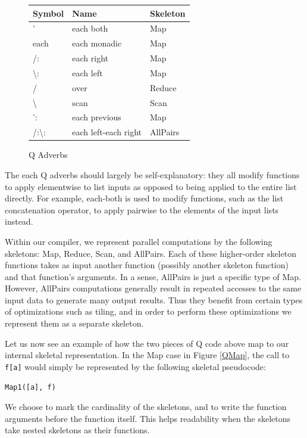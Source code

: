 \documentclass[preprint]{sigplanconf}
\begin{document}
\begin{figure}
\centering
\begin{tabular}{|l|l|l|}
\hline Symbol & Name & Skeleton\\
\hline ' & each both & Map \\
\hline each & each monadic & Map \\
\hline /: & each right & Map \\
\hline \textbackslash: & each left & Map\\
\hline / & over & Reduce \\
\hline \textbackslash & scan & Scan \\
\hline ': & each previous & Map \\
\hline /:\textbackslash: & each left-each right & AllPairs \\
\hline
\end{tabular}
\caption{Q Adverbs}
\label{QAdverbs}
\end{figure}

The each Q adverbs should largely be self-explanatory: they all modify functions to apply elementwise to list inputs as opposed to being applied to the entire list directly.  For example, each-both is used to modify functions, such as the list concatenation operator, to apply pairwise to the elements of the input lists instead.

Within our compiler, we represent parallel computations by the following skeletons: Map, Reduce, Scan, and AllPairs.  Each of these higher-order skeleton functions takes as input another function (possibly another skeleton function) and that function's arguments.  In a sense, AllPairs is just a specific type of Map.  However, AllPairs computations generally result in repeated accesses to the same input data to generate many output results.  Thus they benefit from certain types of optimizations such as tiling, and in order to perform these optimizations we represent them as a separate skeleton.

Let us now see an example of how the two pieces of Q code above map to our internal skeletal representation.  In the Map case in Figure \ref{QMap}, the call to \texttt{f[a]} would simply be represented by the following skeletal pseudocode:

\begin{verbatim}
Map1([a], f)
\end{verbatim}

We choose to mark the cardinality of the skeletons, and to write the function arguments before the function itself.  This helps readability when the skeletons take nested skeletons as their functions.
\end{document}
